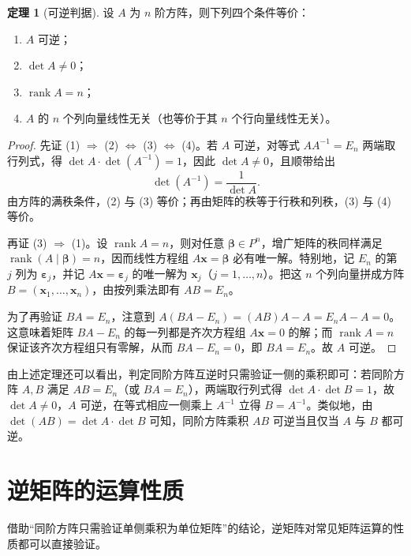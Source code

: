 \documentclass[UTF8, fontset=fandol, a4paper, 12pt]{ctexart}
\newcommand{\rank}{\operatorname{rank}}
\newcommand{\vx}{\boldsymbol{x}}
\newcommand{\vb}{\boldsymbol{\beta}}
\newcommand{\ve}{\boldsymbol{\varepsilon}}
\theoremstyle{definition}
\newtheorem{theorem}[definition]{定理}
\begin{document}
\begin{theorem}[可逆判据]\label{thm:invertibility}
设 $A$ 为 $n$ 阶方阵，则下列四个条件等价：
\begin{enumerate}[label=\textup{(\arabic*)}]
 \item $A$ 可逆；
 \item $\det A\ne0$；
 \item $\rank A=n$；
 \item $A$ 的 $n$ 个列向量线性无关（也等价于其 $n$ 个行向量线性无关）。
\end{enumerate}
\end{theorem}
\begin{proof}
先证 \textup{(1)} $\Rightarrow$ \textup{(2)} $\Leftrightarrow$ \textup{(3)} $\Leftrightarrow$ \textup{(4)}。若 $A$ 可逆，对等式 $AA^{-1}=E_n$ 两端取行列式，得 $\det A\cdot\det(A^{-1})=1$，因此 $\det A\ne0$，且顺带给出
\[
 \det(A^{-1})=\frac{1}{\det A}.
\]
由方阵的满秩条件，\textup{(2)} 与 \textup{(3)} 等价；再由矩阵的秩等于行秩和列秩，\textup{(3)} 与 \textup{(4)} 等价。

再证 \textup{(3)} $\Rightarrow$ \textup{(1)}。设 $\rank A=n$，则对任意 $\vb\in P^n$，增广矩阵的秩同样满足 $\rank(A\mid\vb)=n$，因而线性方程组 $A\vx=\vb$ 必有唯一解。特别地，记 $E_n$ 的第 $j$ 列为 $\ve_j$，并记 $A\vx=\ve_j$ 的唯一解为 $\boldsymbol{x}_j$（$j=1,\ldots,n$）。把这 $n$ 个列向量拼成方阵 $B=(\boldsymbol{x}_1,\ldots,\boldsymbol{x}_n)$，由按列乘法即有 $AB=E_n$。

为了再验证 $BA=E_n$，注意到 $A(BA-E_n)=(AB)A-A=E_nA-A=0$。这意味着矩阵 $BA-E_n$ 的每一列都是齐次方程组 $A\vx=0$ 的解；而 $\rank A=n$ 保证该齐次方程组只有零解，从而 $BA-E_n=0$，即 $BA=E_n$。故 $A$ 可逆。
\end{proof}

由上述定理还可以看出，判定同阶方阵互逆时只需验证一侧的乘积即可：若同阶方阵 $A,B$ 满足 $AB=E_n$（或 $BA=E_n$），两端取行列式得 $\det A\cdot\det B=1$，故 $\det A\ne0$，$A$ 可逆，在等式相应一侧乘上 $A^{-1}$ 立得 $B=A^{-1}$。类似地，由 $\det(AB)=\det A\cdot\det B$ 可知，同阶方阵乘积 $AB$ 可逆当且仅当 $A$ 与 $B$ 都可逆。

\section{逆矩阵的运算性质}

借助“同阶方阵只需验证单侧乘积为单位矩阵”的结论，逆矩阵对常见矩阵运算的性质都可以直接验证。
\end{document}

